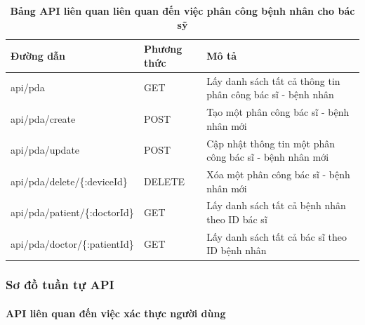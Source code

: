 \begin{enumerate}[a)]
\begin{table}[H]
  \centering
  \caption{\bfseries \fontsize{12pt}{0pt}\selectfont Bảng API liên quan liên quan đến việc phân công bệnh nhân cho bác sỹ}
  \begin{tabularx}{0.9\textwidth}{
  | >{\raggedright\arraybackslash}X
  | >{\raggedright\arraybackslash}m{2cm}
  | >{\raggedright\arraybackslash}X|
  }
  \hline
  \bfseries Đường dẫn    &\bfseries Phương thức    &\bfseries Mô tả\\ \hline
  api/pda   &   GET  & Lấy danh sách tất cả thông tin phân công bác sĩ - bệnh nhân \\ \hline
  api/pda/create  &    POST    & Tạo một phân công bác sĩ - bệnh nhân mới \\ \hline
  api/pda/update  &    POST    & Cập nhật thông tin một phân công bác sĩ - bệnh nhân mới \\ \hline
  api/pda/delete/\{:deviceId\}  &    DELETE    & Xóa một phân công bác sĩ - bệnh nhân mới \\ \hline
  api/pda/patient/\{:doctorId\} &  GET  & Lấy danh sách tất cả bệnh nhân theo ID bác sĩ \\ \hline
  api/pda/doctor/\{:patientId\} &  GET  & Lấy danh sách tất cả bác sĩ theo ID bệnh nhân \\ \hline


  \end{tabularx}
  \label{table_api_pda}
\end{table}



\end{enumerate}




\subsubsection{Sơ đồ tuần tự API}



\paragraph{API liên quan đến việc xác thực người dùng}
\mbox{}

